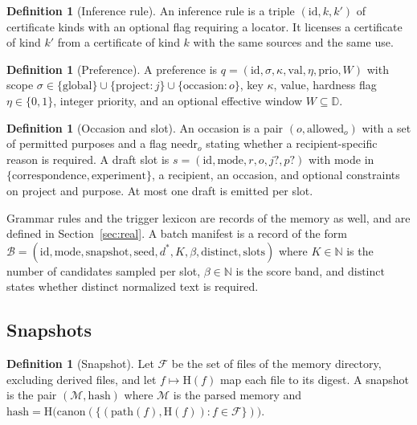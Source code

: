 \documentclass[11pt]{article}
\theoremstyle{definition}
\newtheorem{definition}[theorem]{Definition}
\theoremstyle{remark}
\newcommand{\N}{\mathbb{N}}
\newcommand{\Hash}{\mathrm{H}}
\newcommand{\canon}{\mathrm{canon}}
\begin{document}
\begin{definition}[Inference rule]\label{def:inference}
An inference rule is a triple $(\mathrm{id},k,k')$ of certificate kinds with an optional flag requiring a locator. It licenses a certificate of kind $k'$ from a certificate of kind $k$ with the same sources and the same use.
\end{definition}

\begin{definition}[Preference]\label{def:pref}
A preference is $q=(\mathrm{id},\sigma,\kappa,\mathrm{val},\eta,\mathrm{prio},W)$ with scope $\sigma\in\{\text{global}\}\cup\{\text{project}{:}j\}\cup\{\text{occasion}{:}o\}$, key $\kappa$, value, hardness flag $\eta\in\{0,1\}$, integer priority, and an optional effective window $W\subseteq\mathbb{D}$.
\end{definition}

\begin{definition}[Occasion and slot]
An occasion is a pair $(o,\mathrm{allowed}_o)$ with a set of permitted purposes and a flag $\mathrm{needr}_o$ stating whether a recipient-specific reason is required. A draft slot is $s=(\mathrm{id},\mathrm{mode},r,o,j?,p?)$ with mode in $\{\text{correspondence},\text{experiment}\}$, a recipient, an occasion, and optional constraints on project and purpose. At most one draft is emitted per slot.
\end{definition}

Grammar rules and the trigger lexicon are records of the memory as well, and are defined in Section~\ref{sec:real}. A batch manifest is a record of the form $\mathcal{B}=(\mathrm{id},\mathrm{mode},\mathrm{snapshot},\mathrm{seed},d^\ast,K,\beta,\mathrm{distinct},\mathrm{slots})$ where $K\in\N$ is the number of candidates sampled per slot, $\beta\in\N$ is the score band, and $\mathrm{distinct}$ states whether distinct normalized text is required.

\subsection{Snapshots}

\begin{definition}[Snapshot]\label{def:snapshot}
Let $\mathcal{F}$ be the set of files of the memory directory, excluding derived files, and let $f\mapsto\Hash(f)$ map each file to its digest. A snapshot is the pair $(\mathcal{M},\mathrm{hash})$ where $\mathcal{M}$ is the parsed memory and $\mathrm{hash}=\Hash\bigl(\canon(\{(\mathrm{path}(f),\Hash(f)):f\in\mathcal{F}\})\bigr)$.
\end{definition}
\end{document}

